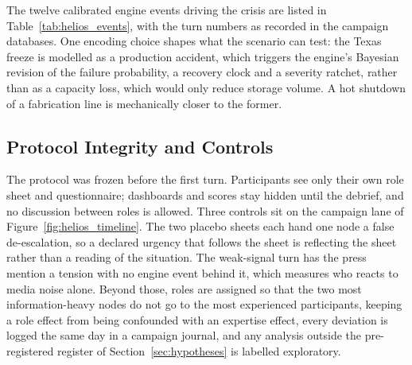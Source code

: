 The twelve calibrated engine events driving the crisis are listed in
Table~\ref{tab:helios_events}, with the turn numbers as recorded in the campaign databases.
One encoding choice shapes what the scenario can test: the Texas freeze is modelled as a
production accident,
which triggers the engine's Bayesian revision of the failure probability, a recovery clock
and a severity ratchet, rather than as a capacity loss, which would only reduce storage
volume. A hot shutdown of a fabrication line is mechanically closer to the former.



\subsection{Protocol Integrity and Controls}
\label{sec:methods_controls}

The protocol was frozen before the first turn. Participants see only their own role sheet and
questionnaire; dashboards and scores stay hidden until the debrief, and no discussion between
roles is allowed. Three controls sit on the campaign lane of
Figure~\ref{fig:helios_timeline}. The two placebo sheets each hand one node a false
de-escalation, so a declared urgency that follows the sheet is reflecting the sheet rather than
a reading of the situation. The weak-signal turn has the press mention a tension with no engine
event behind it, which measures who reacts to media noise alone. Beyond those, roles are
assigned so that the two most information-heavy nodes do not go to the most experienced
participants, keeping a role effect from being confounded with an expertise effect, every
deviation is logged the same day in a campaign journal, and any analysis outside the
pre-registered register of Section~\ref{sec:hypotheses} is labelled exploratory.

